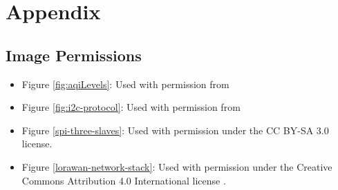 \section{Appendix}
\subsection{Image Permissions}


\begin{itemize}
\item Figure \ref{fig:aqiLevels}: Used with permission from

\item Figure \ref{fig:i2c-protocol}: Used with permission from \cite{i2c-protocol}

\item Figure \ref{spi-three-slaves}: Used with permission under the CC BY-SA 3.0 license. \cite{spi-image}

\item Figure \ref{lorawan-network-stack}: Used with permission under the Creative Commons Attribution 4.0 International license \cite{lorawan-network-stack}.


\end{itemize}
